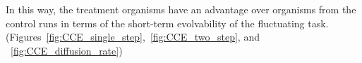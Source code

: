 \documentclass[letterpaper]{article}
\begin{document}
In this way, the treatment organisms
have an advantage over organisms from the control runs in terms of the short-term evolvability of the fluctuating task. (Figures~\ref{fig:CCE_single_step},~\ref{fig:CCE_two_step}, and ~\ref{fig:CCE_diffusion_rate})
\end{document}
